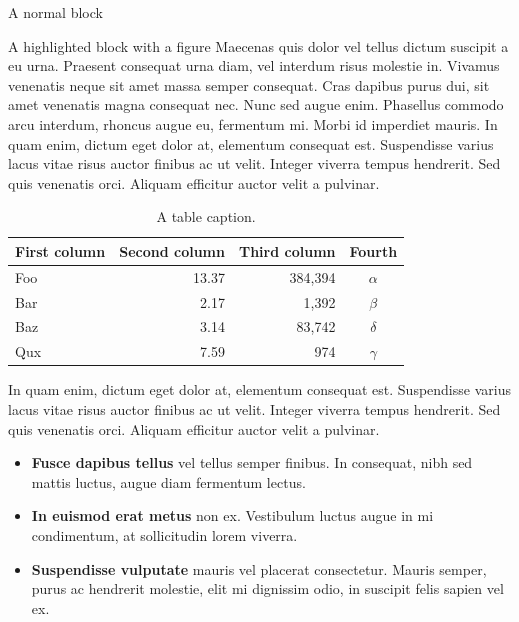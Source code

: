 \documentclass[final]{beamer}
\newlength{\colwidth}
\begin{document}
\begin{frame}[t]
\begin{columns}[t]
\begin{column}{\colwidth}
\begin{block}{A normal block}
  \end{block}
  \begin{alertblock}{A highlighted block with a figure}
       Maecenas quis dolor vel tellus dictum suscipit a eu urna. Praesent consequat urna diam, vel interdum risus molestie in. Vivamus venenatis neque sit amet massa semper consequat. Cras dapibus purus dui, sit amet venenatis magna consequat nec. Nunc sed augue enim. Phasellus commodo arcu interdum, rhoncus augue eu, fermentum mi. Morbi id imperdiet mauris. In quam enim, dictum eget dolor at, elementum consequat est. Suspendisse varius lacus vitae risus auctor finibus ac ut velit. Integer viverra tempus hendrerit. Sed quis venenatis orci. Aliquam efficitur auctor velit a pulvinar. 
    \begin{table}
      \centering
       \caption{A table caption.}
      \begin{tabular}{l r r c}
        \toprule
        \textbf{First column} & \textbf{Second column} & \textbf{Third column} & \textbf{Fourth} \\
        \midrule
        Foo & 13.37 & 384,394 & $\alpha$ \\
        Bar & 2.17 & 1,392 & $\beta$ \\
        Baz & 3.14 & 83,742 & $\delta$ \\
        Qux & 7.59 & 974 & $\gamma$ \\
        \bottomrule
      \end{tabular}
     
    \end{table}
        In quam enim, dictum eget dolor at, elementum consequat est. Suspendisse varius lacus vitae risus auctor finibus ac ut velit. Integer viverra tempus hendrerit. Sed quis venenatis orci. Aliquam efficitur auctor velit a pulvinar. 

    \begin{itemize}
      \item \textbf{Fusce dapibus tellus} vel tellus semper finibus. In
        consequat, nibh sed mattis luctus, augue diam fermentum lectus.
      \item \textbf{In euismod erat metus} non ex. Vestibulum luctus augue in
        mi condimentum, at sollicitudin lorem viverra.
      \item \textbf{Suspendisse vulputate} mauris vel placerat consectetur.
        Mauris semper, purus ac hendrerit molestie, elit mi dignissim odio, in
        suscipit felis sapien vel ex.
    \end{itemize}
    

\end{alertblock}
\end{column}
\end{columns}
\end{frame}
\end{document}
